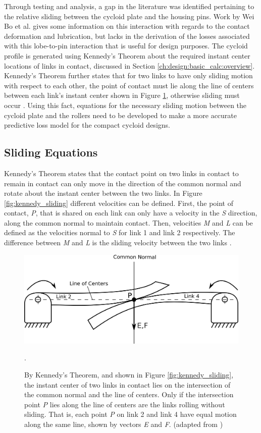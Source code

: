 Through testing and analysis, a gap in the literature was identified pertaining to the relative sliding between the cycloid plate and the housing pins. Work by Wei Bo et al. \cite{ref:sliding} gives some information on this interaction with regards to the contact deformation and lubrication, but lacks in the derivation of the losses associated with this lobe-to-pin interaction that is useful for design purposes. The cycloid profile is generated using Kennedy's Theorem about the required instant center locations of links in contact, discussed in Section \ref{ch:design:basic_calc:overview}. Kennedy's Theorem further states that for two links to have only sliding motion with respect to each other, the point of contact must lie along the line of centers between each link's instant center shown in Figure \ref{fig:kennedy_rolling}, otherwise sliding must occur \cite{ref:kinematics_and_dynamics}. Using this fact, equations for the necessary sliding motion between the cycloid plate and the rollers need to be developed to make a more accurate predictive loss model for the compact cycloid designs.

\subsection{Sliding Equations} \label{ch:design:pin_roll_1s:sliding_equations}

Kennedy's Theorem states that the contact point on two links in contact to remain in contact can only move in the direction of the common normal and rotate about the instant center between the two links. In Figure \ref{fig:kennedy_sliding} different velocities can be defined. First, the point of contact, \textit{P}, that is shared on each link can only have a velocity in the \textit{S} direction, along the common normal to maintain contact. Then, velocities \textit{M} and \textit{L} can be defined as the velocities normal to \textit{S} for link 1 and link 2 respectively. The difference between \textit{M} and \textit{L} is the sliding velocity between the two links \cite{ref:kinematics_and_dynamics}.

\begin{figure}[!b]
   \centering
   \includegraphics[width=0.8\linewidth]{fig/kennedy_rolling}
   \caption{By Kennedy's Theorem, and shown in Figure \ref{fig:kennedy_sliding}, the instant center of two links in contact lies on the intersection of the common normal and the line of centers. Only if the intersection point \textit{P} lies along the line of centers are the links rolling without sliding. That is, each point \textit{P} on link 2 and link 4 have equal motion along the same line, shown by vectors \textit{E} and \textit{F}.
   (adapted from \cite{ref:kinematics_and_dynamics})}
   \label{fig:kennedy_rolling}.
\end{figure}

